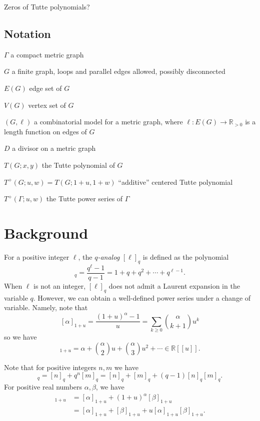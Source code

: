 \documentclass{amsart}
\theoremstyle{definition}
\newcommand{\RR}{\mathbb{R}}
\begin{document}
\cite{RW1,RW2}

Zeros of Tutte polynomials?

\subsection{Notation}

$\Gamma$ a compact metric graph

$G$ a finite graph, 
loops and parallel edges allowed,
possibly disconnected

$E(G)$ edge set of $G$

$V(G)$ vertex set of $G$

$(G,\ell)$ a combinatorial model for a metric graph,
where 
$\ell : E(G) \to \RR_{>0}$
is a length function on edges of $G$

$D$ a divisor on a metric graph

$T(G; x,y)$ the Tutte polynomial of $G$

$T^+(G; u,w) = T(G; 1+u,1+w)$ ``additive'' centered Tutte polynomial

$T^+(\Gamma; u,w)$ the Tutte power series of $\Gamma$




\section{Background}
For a positive integer $\ell$,
the {\em $q$-analog}
$[\ell]_q$ is defined as
the polynomial
\begin{equation*}
[\ell]_q = \frac{q^\ell - 1}{q - 1}
= 1 + q + q^2 + \cdots + q^{\ell -1} .
\end{equation*}
When $\ell$ is not an integer, 
$[\ell]_q$ does not admit a Laurent expansion in the variable $q$.
However, we can obtain a well-defined power series under a change of variable.
Namely, note that
\[ [\alpha]_{1+u} = \frac{(1+u)^\alpha - 1}{u}
= \sum_{k \geq 0} \binom{\alpha}{k+1}u^{k} 
\]
so we have 
\begin{equation}
[\alpha]_{1+u} = \alpha + \binom{\alpha}{2} u + \binom{\alpha}{3} u^2 + \cdots
\in \RR[[u]] .
\end{equation}

Note that for positive integers $n,m$ we have
\begin{equation*}
[n + m]_q =  [n ]_q + q^{n} [m]_q
 = [n]_q + [m]_q + (q-1) [n]_q [m]_q .
\end{equation*}
For positive real numbers $\alpha,\beta$, we have
\begin{align*}
[\alpha + \beta]_{1+u} &=  [\alpha]_{1+u} + (1+u)^{\alpha} [\beta]_{1+u} \\
 &= [\alpha]_{1+u} + [\beta]_{1+u} + u [\alpha]_{1+u} [\beta]_{1+u}.
\end{align*}
\end{document}
